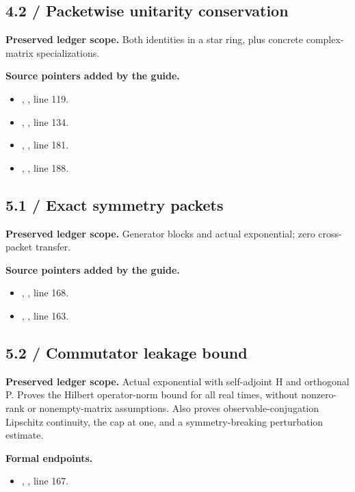 \subsection{4.2 / Packetwise unitarity conservation}
\label{result:4.2}
\textbf{Preserved ledger scope.} Both identities in a star ring, plus concrete complex-matrix specializations.

\textbf{Source pointers added by the guide.}\begin{itemize}
\item {}, , line 119.
\item {}, , line 134.
\item {}, , line 181.
\item {}, , line 188.
\end{itemize}
\subsection{5.1 / Exact symmetry packets}
\label{result:5.1}
\textbf{Preserved ledger scope.} Generator blocks and actual exponential; zero cross-packet transfer.

\textbf{Source pointers added by the guide.}\begin{itemize}
\item {}, , line 168.
\item {}, , line 163.
\end{itemize}
\subsection{5.2 / Commutator leakage bound}
\label{result:5.2}
\textbf{Preserved ledger scope.} Actual exponential with self-adjoint H and orthogonal P. Proves the Hilbert operator-norm bound for all real times, without nonzero-rank or nonempty-matrix assumptions. Also proves observable-conjugation Lipschitz continuity, the cap at one, and a symmetry-breaking perturbation estimate.

\textbf{Formal endpoints.}\begin{itemize}
\item {}, , line 167.
\end{itemize}
